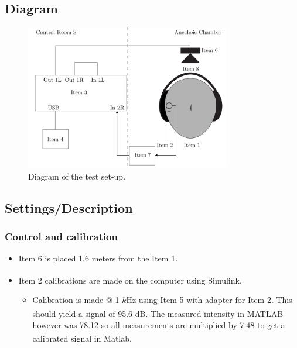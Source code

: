 \subsection{Diagram}
\begin{figure}[H]
	\centering
	\includegraphics[width=0.8\textwidth]{../Journal/Experiments/TestofConsumerHeadphones/OtherBrandsDiagram.pdf}
	\caption{Diagram of the test set-up.}
	\label{OtherBrandsDiagram}
\end{figure}

\subsection{Settings/Description}
\subsubsection{Control and calibration}
\begin{itemize}
	\item Item 6  is placed 1.6 meters from the Item 1.
	\item Item 2 calibrations are made on the computer using Simulink\textsuperscript{\textregistered}.
	\begin{itemize} 
		\item Calibration is made @ 1 $k$Hz using Item 5 with adapter for Item 2. This should yield a signal of 95.6 dB. The measured intensity in MATLAB\textsuperscript{\textregistered} however was 78.12 so all measurements are multiplied by 7.48 to get a calibrated signal in Matlab\textsuperscript{\textregistered}.
	\end{itemize}
\end{itemize}

